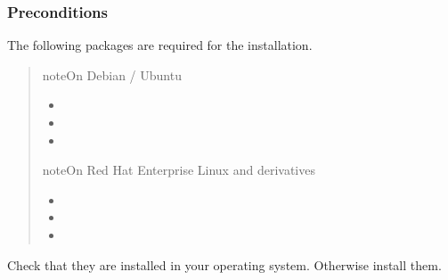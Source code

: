 \documentclass[letterpaper,10pt,english]{sphinxmanual}
\begin{document}
\subsubsection{Preconditions}
\label{\detokenize{install/tarball:preconditions}}
\sphinxAtStartPar
The following packages are required for the installation.
\begin{quote}

\begin{sphinxadmonition}{note}{On Debian / Ubuntu}
\begin{itemize}
\item {} 
\sphinxAtStartPar
{}

\item {} 
\sphinxAtStartPar
{}

\item {} 
\sphinxAtStartPar
{}

\end{itemize}
\end{sphinxadmonition}

\begin{sphinxadmonition}{note}{On Red Hat Enterprise Linux and derivatives}
\begin{itemize}
\item {} 
\sphinxAtStartPar
{}

\item {} 
\sphinxAtStartPar
{}

\item {} 
\sphinxAtStartPar
{}

\end{itemize}
\end{sphinxadmonition}
\end{quote}

\sphinxAtStartPar
Check that they are installed in your operating system. Otherwise install them.
\end{document}

